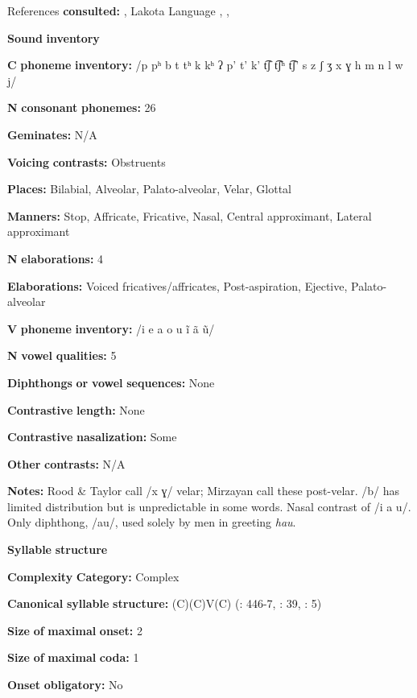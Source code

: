 References \textbf{consulted:} \citet{Ingham2003}, Lakota Language \citet{Consortium2008}, \citet{Mirzayan2010}, \citet{RoodTaylor1996}

\textbf{Sound} \textbf{inventory}

\textbf{C} \textbf{phoneme} \textbf{inventory:} /p pʰ b t tʰ k kʰ ʔ p’ t’ k’ t͡ʃ t͡ʃʰ t͡ʃ’ s z ʃ ʒ x ɣ h m n l w j/

\textbf{N} \textbf{consonant} \textbf{phonemes:} 26

\textbf{Geminates:} N/A

\textbf{Voicing} \textbf{contrasts:} Obstruents

\textbf{Places:} Bilabial, Alveolar, Palato-alveolar, Velar, Glottal

\textbf{Manners:} Stop, Affricate, Fricative, Nasal, Central approximant, Lateral approximant

\textbf{N} \textbf{elaborations:} 4

\textbf{Elaborations:} Voiced fricatives/affricates, Post-aspiration, Ejective, Palato-alveolar

\textbf{V} \textbf{phoneme} \textbf{inventory:} /i e a o u ĩ ã ũ/

\textbf{N} \textbf{vowel} \textbf{qualities:} 5

\textbf{Diphthongs} \textbf{or} \textbf{vowel} \textbf{sequences:} None

\textbf{Contrastive} \textbf{length:} None

\textbf{Contrastive} \textbf{nasalization:} Some

\textbf{Other} \textbf{contrasts:} N/A

\textbf{Notes:} Rood \& Taylor call /x ɣ/ velar; Mirzayan call these post-velar. /b/ has limited distribution but is unpredictable in some words. Nasal contrast of /i a u/. Only diphthong, /au/, used solely by men in greeting \textit{hau}.

\textbf{Syllable} \textbf{structure}

\textbf{Complexity} \textbf{Category:} Complex

\textbf{Canonical} \textbf{syllable} \textbf{structure:} (C)(C)V(C) (\citealt{RoodTaylor1996}: 446-7, \citealt{Mirzayan2010}: 39, \citealt{Ingham2003}: 5)

\textbf{Size} \textbf{of} \textbf{maximal} \textbf{onset:} 2

\textbf{Size} \textbf{of} \textbf{maximal} \textbf{coda:} 1

\textbf{Onset} \textbf{obligatory:} No


